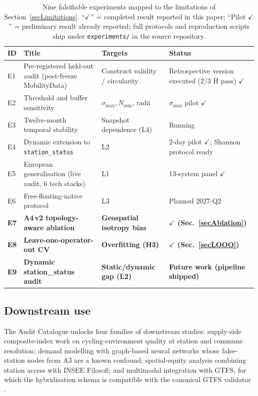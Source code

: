 \documentclass[11pt,a4paper]{article}
\begin{document}
\begin{table}[ht]
\centering
\caption{Nine falsifiable experiments mapped to the limitations of
Section~\ref{secLimitations}. ``$\checkmark$'' = completed result
reported in this paper; ``Pilot $\checkmark$'' = preliminary result
already reported; full protocols and reproduction scripts ship under
\texttt{experiments/} in the source repository.}
\label{tab:roadmap}
\small
\begin{tabular}{@{}llll@{}}
\toprule
\textbf{ID} & \textbf{Title} & \textbf{Targets} & \textbf{Status}\\
\midrule
E1 & Pre-registered held-out audit (post-freeze MobilityData) & Construct validity / circularity & Retrospective version executed (2/3 H pass) $\checkmark$ \\
E2 & Threshold and buffer sensitivity           & $\sigma_{\max}, N_{\min}$, radii & $\sigma_{\max}$ pilot $\checkmark$ \\
E3 & Twelve-month temporal stability            & Snapshot dependence (L4)    & Running \\
E4 & Dynamic extension to \texttt{station\_status} & L2                       & 2-day pilot $\checkmark$; Shannon protocol ready \\
E5 & European generalisation (live audit, 6 tech stacks) & L1                  & 13-system panel $\checkmark$ \\
E6 & Free-floating-native protocol              & L3                          & Planned 2027-Q2 \\
\textbf{E7} & \textbf{A4\,v2 topology-aware ablation} & \textbf{Geospatial isotropy bias} & \textbf{$\checkmark$ (Sec.~\ref{secAblation})} \\
\textbf{E8} & \textbf{Leave-one-operator-out CV}       & \textbf{Overfitting (H3)}          & \textbf{$\checkmark$ (Sec.~\ref{secLOOO})} \\
\textbf{E9} & \textbf{Dynamic station\_status audit} & \textbf{Static/dynamic gap (L2)}  & \textbf{Future work (pipeline shipped)} \\
\bottomrule
\end{tabular}
\end{table}

\subsection{Downstream use}
The Audit Catalogue unlocks four families of downstream studies:
supply-side composite-index work on cycling-environment quality at
station and commune resolution; demand modelling with graph-based
neural networks \cite{Lin2018BSSGraph} whose false-station nodes
from A3 are a known confound; spatial-equity analysis combining
station access with INSEE Filosofi; and multimodal integration with
GTFS, for which the hybridisation schema is compatible with the
canonical GTFS validator \cite{MobilityData2024Validator}.
\end{document}
